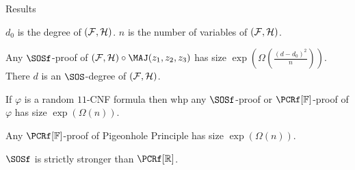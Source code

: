 \begin{frame}{Results}

    $d_0$ is the degree of $(\mathcal{F}, \mathcal{H})$. $n$ is the number of variables of $(\mathcal{F}, \mathcal{H})$.
    
    \begin{theorem}
        Any $\SOSf$-proof of $(\Fs, \Hs) \circ \MAJ(z_1, z_2, z_3)$ has size
        $\exp(\Omega(\frac{(d - d_0)^2}{n}))$. There $d$ is an $\SOS$-degree of $(\mathcal{F}, \mathcal{H})$.
    \end{theorem}

    \pause

    \begin{theorem}
        If $\varphi$ is a random $11$-CNF formula then whp any $\SOSf$-proof or $\PCRf[\field]$-proof of
        $\varphi$ has size $\exp(\Omega(n))$.
    \end{theorem}

    \pause
    \begin{theorem}
        Any $\PCRf[\field]$-proof of Pigeonhole Principle has size $\exp(\Omega(n))$.
    \end{theorem}

    $\SOSf$ is strictly stronger than $\PCRf[\mathbb{R}]$.

\end{frame}